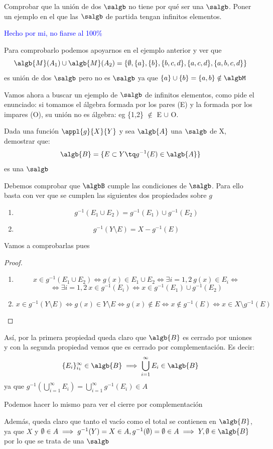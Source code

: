\begin{problem}
Comprobar que la unión de dos $\salgb$ no tiene por qué ser una $\salgb$. Poner un ejemplo en el que las $\salgb$ de partida tengan infinitos elementos.

\solution
\textcolor{blue}{Hecho por mi, no fiarse al 100\%}

Para comprobarlo podemos apoyarnos en el ejemplo anterior y ver que
\[\algb{M}(A_1) \cup \algb{M}(A_2) = \{\emptyset, \{a\}, \{b\}, \{b,c,d\}, \{a,c,d\}, \{a,b,c,d\}\}\]
es unión de dos $\salgb$ pero no es $\salgb$ ya que $\{a\} \cup \{b\} = \{a,b\} \notin \algbM$

Vamos ahora a buscar un ejemplo de $\salgb$ de infinitos elementos, como pide el enunciado: si tomamos el álgebra formada por los pares (E) y la formada por los impares (O), su unión no es álgebra: eg \{1,2\} $\notin$ E $\cup$ O.
\end{problem}

\begin{problem}[4]
Dada una función $\appl{g}{X}{Y}$ y sea $\algb{A}$ una $\salgb$ de X, demostrar que:
\[\algb{B}=\{E\subset Y \tq g^{-1}(E)\in \algb{A}\}\]
es una $\salgb$

\solution
Debemos comprobar que $\algbB$ cumple las condiciones de $\salgb$. Para ello basta con ver que se cumplen las siguientes dos propiedades sobre $g$
\begin{enumerate}
\item
\[g^{-1}(E_1 \cup E_2)=g^{-1}(E_1) \cup g^{-1}(E_2)\]
\item
\[g^{-1}(Y \setminus E) = X - g^{-1}(E)\]
\end{enumerate}
Vamos a comprobarlas pues
\begin{proof}
\begin{enumerate}
\item
\[x\in g^{-1}(E_1 \cup E_2) \iff g(x) \in E_1 \cup E_2 \iff  \exists i=1,2 \ g(x) \in E_i \iff \]
\[\iff \exists i=1,2 \ x\in g^{-1}(E_i) \iff x\in g^{-1}(E_1) \cup g^{-1}(E_2) \]
\item
\[x\in g^{-1}(Y \setminus E) \iff g(x) \in Y \setminus E \iff g(x) \notin E \iff x \notin g^{-1}(E) \iff x \in X\setminus g^{-1}(E)\]
\end{enumerate}

\end{proof}
Así, por la primera propiedad queda claro que $\algb{B}$ es cerrado por uniones y con la segunda propiedad vemos que es cerrado por complementación. Es decir:
\[\{E_i\}_{i_1}^{\infty} \in \algb{B} \implies \bigcup_{i=1}^{\infty} E_i \in \algb{B}\]
ya que $g^{-1}(\bigcup_{i=1}^{\infty} E_i) = \bigcup_{i=1}^{\infty} g^{-1}(E_i) \in A$

Podemos hacer lo mismo para ver el cierre por complementación

Además, queda claro que tanto el vacío como el total se contienen en $\algb{B}$, ya que $X$ y $\emptyset \in A \implies g^{-1}(Y)=X \in A, g^{-1}(\emptyset)=\emptyset \in A \implies Y, \emptyset \in \algb{B}$ por lo que se trata de una $\salgb$
\end{problem}


